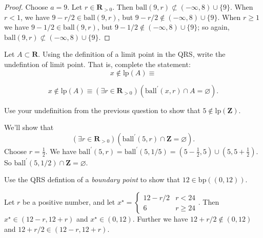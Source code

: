 \documentclass[12pt, fleqn, answers]{exam}
\newcommand{\reals}{\mathbf{R}}
\newcommand{\integers}{\mathbf{Z}}
\newcommand{\bp}{\mathrm{bp}}
\newcommand{\lp}{\mathrm{lp}}
\newcommand{\ball}{\mathrm{ball}}
\begin{document}
\begin{questions}
\begin{solution}
\begin{proof}
Choose $a = 9$. Let $r \in \reals_{>0}$. Then $\ball(9,r) \not \subset (-\infty, 8) \cup \{9 \}$.
When $r < 1$, we have $9-r/2 \in \ball(9,r)$, but $9-r/2 \notin (-\infty, 8) \cup \{9 \}$. 
When $r \geq 1$ we have $9-1/2  \in \ball(9,r)$, but $9-1/2 \notin (-\infty, 8) \cup \{9 \}$;
so again, $\ball(9,r) \not \subset (-\infty, 8) \cup \{9 \}$.
\end{proof}
\end{solution}
\question Let $A \subset \reals$.  Using the definition of a limit point in the QRS, write
the undefintion of limit point. That is, complete the statement:
\begin{equation*}
  x \not \in \lp(A) \equiv 
\end{equation*}

\begin{solution}
  \begin{equation*}
    x \not \in \lp(A) \equiv  \left(\exists r \in \reals_{>0} \right)
    \left(\ball^\prime(x,r) \cap A = \varnothing \right).
  \end{equation*}
\end{solution}
\question  Use your undefinition from the previous question to show that \(5 \notin  \lp (\integers)\).


\begin{solution}%
  We'll show that
  \begin{equation*}
  \left(\exists r \in \reals_{>0} \right)
  \left(\ball^\prime(5,r) \cap \integers = \varnothing \right).
  \end{equation*}
  Choose $r = \frac{1}{2}$. We have $\ball^\prime(5,r) = \ball^\prime(5,1/5) 
  = (5-\frac{1}{2}, 5) \cup (5, 5+\frac{1}{2})$. So $\ball^\prime(5,1/2)
  \cap \integers = \varnothing$.
  

\end{solution}

\question  Use the QRS defintion of a \emph{boundary point} to show that $12 \in \bp((0,12))$.


\begin{solution}%
Let \(r\) be a positive number, and let \(x^\star = \begin{cases} 12 - r/2 & r < 24 \\
                                                                      6  & r \geq 24 
\end{cases}\). Then \(x^\star \in (12-r, 12+ r)\) and \(x^\star \in (0,12)\). Further
we have \(12 + r /2 \notin (0,12)\) and \(12 + r/2 \in (12-r, 12+ r)\).


\end{solution}
\end{questions}
\end{document}
